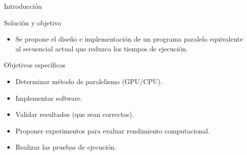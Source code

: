 \begin{frame}{Introducción}
\begin{block}{Solución y objetivo}
\begin{itemize}
  \item Se propone el diseño e implementación de un programa paralelo equivalente al secuencial actual que reduzca los tiempos de ejecución.
\end{itemize}
\end{block}
\begin{block}{Objetivos específicos}
\begin{itemize}
  \item Determinar método de paralelismo (GPU/CPU).
  \item Implementar software.
  \item Validar resultados (que sean correctos).
  \item Proponer experimentos para evaluar rendimiento computacional.
  \item Realizar las pruebas de ejecución.
\end{itemize}
\end{block}
\end{frame}